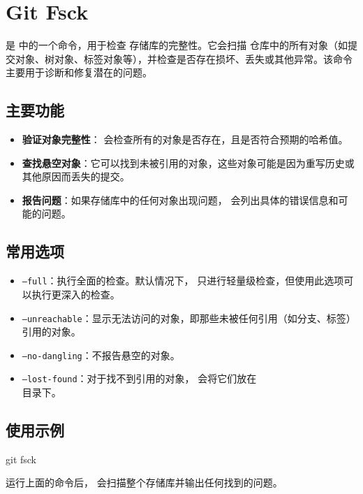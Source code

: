 \section{Git Fsck}

 是  中的一个命令，用于检查  存储库的完整性。它会扫描  仓库中的所有对象（如提交对象、树对象、标签对象等），并检查是否存在损坏、丢失或其他异常。该命令主要用于诊断和修复潜在的问题。

\subsection*{主要功能}
\begin{itemize}
	\item \textbf{验证对象完整性}： 会检查所有的对象是否存在，且是否符合预期的哈希值。
	\item \textbf{查找悬空对象}：它可以找到未被引用的对象，这些对象可能是因为重写历史或其他原因而丢失的提交。
	\item \textbf{报告问题}：如果存储库中的任何对象出现问题， 会列出具体的错误信息和可能的问题。
\end{itemize}

\subsection*{常用选项}
\begin{itemize}
	\item \texttt{--full}：执行全面的检查。默认情况下， 只进行轻量级检查，但使用此选项可以执行更深入的检查。
	\item \texttt{--unreachable}：显示无法访问的对象，即那些未被任何引用（如分支、标签）引用的对象。
	\item \texttt{--no-dangling}：不报告悬空的对象。
	\item \texttt{--lost-found}：对于找不到引用的对象， 会将它们放在\\  目录下。
\end{itemize}

\subsection*{使用示例}
\begin{shellcmd}
git fsck
\end{shellcmd}

运行上面的命令后， 会扫描整个存储库并输出任何找到的问题。

